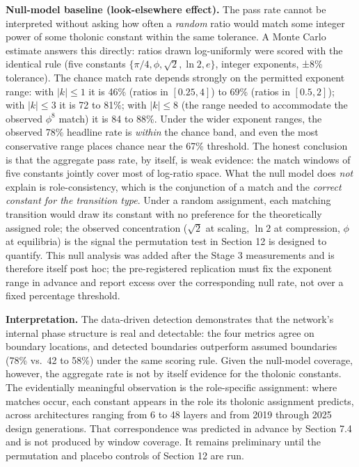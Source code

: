 \documentclass[
  11pt,
  letterpaper,
]{article}
\begin{document}
\textbf{Null-model baseline (look-elsewhere effect).} The pass rate
cannot be interpreted without asking how often a \emph{random} ratio
would match some integer power of some tholonic constant within the same
tolerance. A Monte Carlo estimate answers this directly: ratios drawn
log-uniformly were scored with the identical rule (five constants
\(\{\pi/4, \phi, \sqrt{2}, \ln 2, e\}\), integer exponents, ±8\%
tolerance). The chance match rate depends strongly on the permitted
exponent range: with \(|k| \le 1\) it is 46\% (ratios in \([0.25, 4]\))
to 69\% (ratios in \([0.5, 2]\)); with \(|k| \le 3\) it is 72 to 81\%;
with \(|k| \le 8\) (the range needed to accommodate the observed
\(\phi^8\) match) it is 84 to 88\%. Under the wider exponent ranges, the
observed 78\% headline rate is \emph{within} the chance band, and even
the most conservative range places chance near the 67\% threshold. The
honest conclusion is that the aggregate pass rate, by itself, is weak
evidence: the match windows of five constants jointly cover most of
log-ratio space. What the null model does \emph{not} explain is
role-consistency, which is the conjunction of a match and the
\emph{correct constant for the transition type}. Under a random
assignment, each matching transition would draw its constant with no
preference for the theoretically assigned role; the observed
concentration (\(\sqrt{2}\) at scaling, \(\ln 2\) at compression,
\(\phi\) at equilibria) is the signal the permutation test in Section 12
is designed to quantify. This null analysis was added after the Stage 3
measurements and is therefore itself post hoc; the pre-registered
replication must fix the exponent range in advance and report excess
over the corresponding null rate, not over a fixed percentage threshold.

\textbf{Interpretation.} The data-driven detection demonstrates that the
network's internal phase structure is real and detectable: the four
metrics agree on boundary locations, and detected boundaries outperform
assumed boundaries (78\% vs.~42 to 58\%) under the same scoring rule.
Given the null-model coverage, however, the aggregate rate is not by
itself evidence for the tholonic constants. The evidentially meaningful
observation is the role-specific assignment: where matches occur, each
constant appears in the role its tholonic assignment predicts, across
architectures ranging from 6 to 48 layers and from 2019 through 2025
design generations. That correspondence was predicted in advance by
Section 7.4 and is not produced by window coverage. It remains
preliminary until the permutation and placebo controls of Section 12 are
run.
\end{document}
